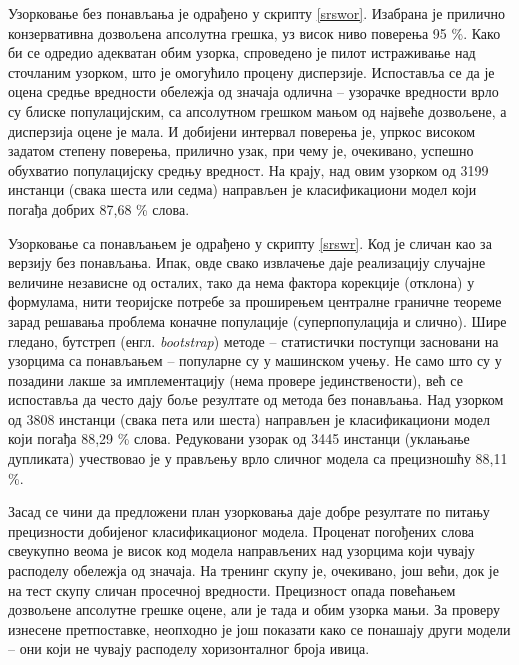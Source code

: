 \documentclass[a4paper]{article}
\begin{document}
Узорковање без понављања је одрађено у скрипту \ref{srswor}. Изабрана је прилично конзервативна дозвољена апсолутна грешка, уз висок ниво поверења 95 \%. Како би се одредио адекватан обим узорка, спроведено је пилот истраживање над сточланим узорком, што је омогућило процену дисперзије. Испоставља се да је оцена средње вредности обележја од значаја одлична -- узорачке вредности врло су блиске популацијским, са апсолутном грешком мањом од највеће дозвољене, а дисперзија оцене је мала. И добијени интервал поверења је, упркос високом  задатом степену поверења, прилично узак, при чему је, очекивано, успешно обухватио популацијску средњу вредност. На крају, над овим узорком од 3199 инстанци (свака шеста или седма) направљен је класификациони модел који погађа добрих 87,68 \% слова.



Узорковање са понављањем је одрађено у скрипту \ref{srswr}. Код је сличан као за верзију без понављања. Ипак, овде свако извлачење даје реализацију случајне величине независне од осталих, тако да нема фактора корекције (отклона) у формулама, нити теоријске потребе за проширењем централне граничне теореме зарад решавања проблема коначне популације (суперпопулација и слично). Шире гледано, бутстреп (енгл. \textit{bootstrap}) методе -- статистички поступци засновани на узорцима са понављањем -- популарне су у машинском учењу. Не само што су у позадини лакше за имплементацију (нема провере јединствености), већ се испоставља да често дају боље резултате од метода без понављања. Над узорком од 3808 инстанци (свака пета или шеста) направљен је класификациони модел који погађа 88,29 \% слова. Редуковани узорак од 3445 инстанци (уклањање дупликата) учествовао је у прављењу врло сличног модела са прецизношћу 88,11 \%.



Засад се чини да предложени план узорковања даје добре резултате по питању прецизности добијеног класификационог модела. Проценат погођених слова свеукупно веома је висок код модела направљених над узорцима који чувају расподелу обележја од значаја. На тренинг скупу је, очекивано, још већи, док је на тест скупу сличан просечној вредности. Прецизност опада повећањем дозвољене апсолутне грешке оцене, али је тада и обим узорка мањи. За проверу изнесене претпоставке, неопходно је још показати како се понашају други модели -- они који не чувају расподелу хоризонталног броја ивица.
\end{document}
